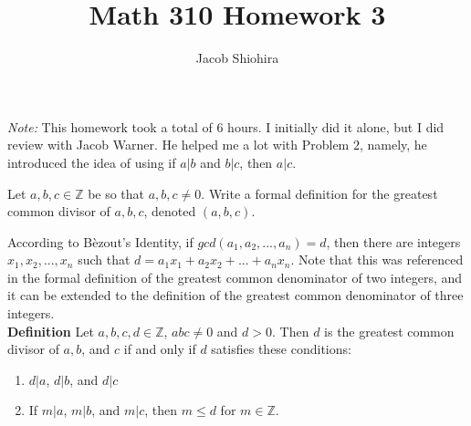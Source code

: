\documentclass[12pt]{article}
\newcommand{\Z}{\mathbb{Z}}
\newenvironment{problem}[2][Problem]{\begin{trivlist}
\item[\hskip \labelsep {\bfseries #1}\hskip \labelsep {\bfseries #2.}]}{\end{trivlist}}
\begin{document}
 
\title{Math 310 Homework 3}
\author{Jacob Shiohira}
\maketitle

\noindent
\textit{Note:} This homework took a total of 6 hours. I initially did it alone, but I did review with Jacob Warner. He helped me a lot with Problem $2$, namely, he introduced the idea of using if $a|b$ and $b|c$, then $a|c$.

\begin{problem}{1}
Let $a,b,c \in \mathbb{Z}$ be so that $a,b,c \neq 0.$ Write a formal definition for the greatest common divisor of $a,b,c$, denoted $(a,b,c)$.

\vspace{.3cm}

\noindent
According to B\`ezout's Identity, if $gcd(a_1, a_2, ..., a_n)=d$, then there are integers $x_1, x_2, ..., x_n$ such that $d=a_1x_1+a_2x_2+...+a_nx_n$. Note that this was referenced in the formal definition of the greatest common denominator of two integers, and it can be extended to the definition of the greatest common denominator of three integers.\\

\noindent
\textbf{Definition} Let $a,b,c,d \in \Z$, $abc \neq 0$ and $d>0$. Then $d$ is the greatest common divisor of $a,b$, and $c$ if and only if $d$ satisfies these conditions:
\begin{enumerate}[label=\roman*] 
\item $d|a$, $d|b$, and $d|c$
\item If $m|a$, $m|b$, and $m|c$, then $m \leq d$ for $m \in \Z$.
\end{enumerate}
\end{problem}

\end{document}
